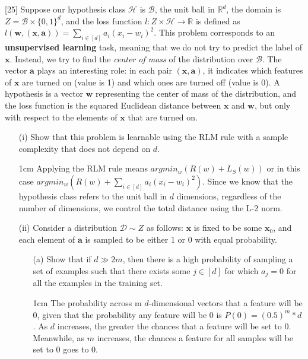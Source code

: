 \documentclass[11pt, fleqn]{exam}
\newenvironment{mathline}{\begin{adjustwidth}{1cm}{}}{\end{adjustwidth}}
\begin{document}
\begin{questions}
[25]
Suppose our hypothesis class $\mathcal{H}$ is $\mathcal{B}$, the unit ball in $\mathbb{R}^d$, the domain is $Z = \mathcal{B} \times \{0,1\}^d$, and the loss function $l: Z \times \mathcal{H} \rightarrow \mathbb{R}$ is defined as $l(\mathbf{w}, (\mathbf{x}, \mathbf{a})) = \sum_{i \in [d]}a_i(x_i - w_i)^2$. This problem corresponds to an \textbf{unsupervised learning} task, meaning that we do not try to predict the label of $\mathbf{x}$. Instead, we try to find the \textit{center of mass} of the distribution over $\mathcal{B}$. The vector $\mathbf{a}$ plays an interesting role: in each pair $(\mathbf{x}, \mathbf{a})$, it indicates which features of $\mathbf{x}$ are turned on (value is 1) and which ones are turned off (value is 0). A hypothesis is a vector $\mathbf{w}$ representing the center of mass of the distribution, and the loss function is the squared Euclidean distance between $\mathbf{x}$ and $\mathbf{w}$, but only with respect to the elements of $\mathbf{x}$ that are turned on.
\begin{itemize}
\item[(i)] Show that this problem is learnable using the RLM rule with a sample complexity that does not depend on $d$.
\begin{mathline}
    Applying the RLM rule means $argmin_w(R(w)+L_S(w))$ or in this case $argmin_w(R(w)+\sum_{i \in [d]}a_i(x_i - w_i)^2)$. Since we know that the hypothesis class refers to the unit ball in $d$ dimensions, regardless of the number of dimensions, we control the total distance using the L-2 norm.
\end{mathline}
\item[(ii)] Consider a distribution $\mathcal{D} \sim Z$ as follows: $\mathbf{x}$ is fixed to be some $\mathbf{x}_0$, and each element of $\mathbf{a}$ is sampled to be either 1 or 0 with equal probability.
  \begin{itemize}
  \item[(a)] Show that if $d \gg 2m$, then there is a high probability of sampling a set of examples such that there exists some $j \in [d]$ for which $a_j = 0$ for all the examples in the training set.
  \begin{mathline}
    The probability across m $d$-dimensional vectors that a feature will be 0, given that the probability any feature will be 0 is $P(0)=(0.5)^m*d$. As $d$ increases, the greater the chances that a feature will be set to 0. Meanwhile, as $m$ increases, the chances a feature for all samples will be set to $0$ goes to 0.

\end{mathline}
\end{itemize}
\end{itemize}
\end{questions}
\end{document}
